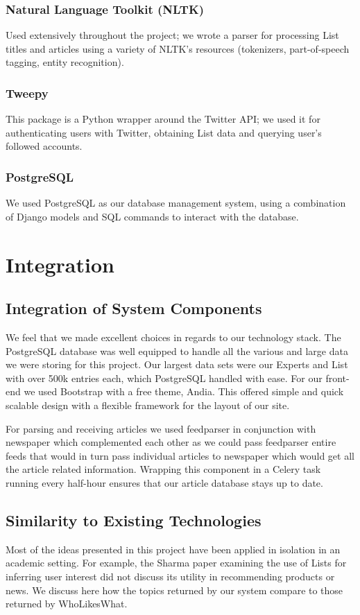 \documentclass[11pt]{article}
\begin{document}
\subsubsection*{Natural Language Toolkit (NLTK)\cite{nltk}}
Used extensively throughout the project; we wrote a parser for processing List titles and articles using a variety of NLTK's resources (tokenizers, part-of-speech tagging, entity recognition).
\subsubsection*{Tweepy}
This package is a Python wrapper around the Twitter API; we used it for authenticating users with Twitter, obtaining List data and querying user's followed accounts.
\subsubsection*{PostgreSQL}
We used PostgreSQL as our database management system, using a combination of Django models and SQL  commands to interact with the database.

\section{Integration}
\subsection{Integration of System Components}
We feel that we made excellent choices in regards to our technology stack. The PostgreSQL database was well equipped to handle all the various and large data we were storing for this project. Our largest data sets were our Experts and List with over 500k entries each, which PostgreSQL handled with ease. For our front-end we used Bootstrap with a free theme, Andia\cite{andia}. This offered simple and quick scalable design with a flexible framework for the layout of our site. 

For parsing and receiving articles we used feedparser in conjunction with newspaper which complemented each other as we could pass feedparser entire feeds that would in turn pass individual articles to newspaper which would get all the article related information. Wrapping this component in a Celery task running every half-hour ensures that our article database stays up to date.

\subsection{Similarity to Existing Technologies}
Most of the ideas presented in this project have been applied in isolation in an academic setting. For example, the Sharma paper examining the use of Lists for inferring user interest did not discuss its utility in recommending products or news. We discuss here how the topics returned by our system compare to those returned by WhoLikesWhat.
 
\end{document}
